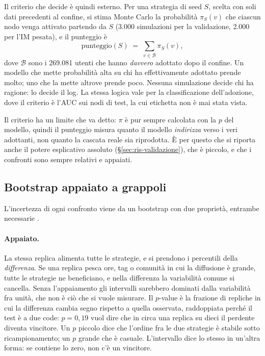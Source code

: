 \documentclass[11pt,a4paper]{article}
\begin{document}
Il criterio che decide è quindi esterno. Per una strategia di seed $S$, scelta con soli dati precedenti al confine, si stima Monte Carlo la probabilità $\pi_S(v)$ che ciascun nodo venga attivato partendo da $S$ (3.000 simulazioni per la validazione, 2.000 per l'IM pesata), e il punteggio è
\begin{equation}
  \mathrm{punteggio}(S) \;=\; \sum_{v \in \mathcal{B}} \pi_S(v),
\end{equation}
dove $\mathcal{B}$ sono i 269.081 utenti che hanno \emph{davvero} adottato dopo il confine. Un modello che mette probabilità alta su chi ha effettivamente adottato prende molto; uno che la mette altrove prende poco. Nessuna simulazione decide chi ha ragione: lo decide il log. La stessa logica vale per la classificazione dell'adozione, dove il criterio è l'AUC sui nodi di test, la cui etichetta non è mai stata vista.

Il criterio ha un limite che va detto: $\pi$ è pur sempre calcolata con la $p$ del modello, quindi il punteggio misura quanto il modello \emph{indirizza} verso i veri adottanti, non quanto la cascata reale sia riprodotta. È per questo che si riporta anche il potere esplicativo assoluto (\S\ref{sec:ris-validazione}), che è piccolo, e che i confronti sono sempre relativi e appaiati.

\subsection{Bootstrap appaiato a grappoli}
L'incertezza di ogni confronto viene da un bootstrap con due proprietà, entrambe necessarie \citep{efron1994}.

\paragraph{Appaiato.} La stessa replica alimenta tutte le strategie, e si prendono i percentili della \emph{differenza}. Se una replica pesca ore, tag o comunità in cui la diffusione è grande, tutte le strategie ne beneficiano, e nella differenza la variabilità comune si cancella. Senza l'appaiamento gli intervalli sarebbero dominati dalla variabilità fra unità, che non è ciò che si vuole misurare. Il $p$-value è la frazione di repliche in cui la differenza cambia segno rispetto a quella osservata, raddoppiata perché il test è a due code: $p = 0{,}19$ vuol dire che in circa una replica su dieci il perdente diventa vincitore. Un $p$ piccolo dice che l'ordine fra le due strategie è stabile sotto ricampionamento; un $p$ grande che è casuale. L'intervallo dice lo stesso in un'altra forma: se contiene lo zero, non c'è un vincitore.
\end{document}
